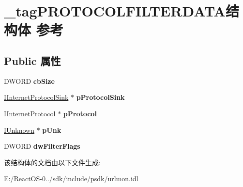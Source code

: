 \hypertarget{struct__tag_p_r_o_t_o_c_o_l_f_i_l_t_e_r_d_a_t_a}{}\section{\+\_\+tag\+P\+R\+O\+T\+O\+C\+O\+L\+F\+I\+L\+T\+E\+R\+D\+A\+T\+A结构体 参考}
\label{struct__tag_p_r_o_t_o_c_o_l_f_i_l_t_e_r_d_a_t_a}
\subsection*{Public 属性}
\begin{DoxyCompactItemize}
\item 
\mbox{\label{struct__tag_p_r_o_t_o_c_o_l_f_i_l_t_e_r_d_a_t_a_ad8ba3bdd16765b69b56fede4b9c3e1f0}} 
D\+W\+O\+RD {\bfseries cb\+Size}
\item 
\mbox{\label{struct__tag_p_r_o_t_o_c_o_l_f_i_l_t_e_r_d_a_t_a_a4d2bbe31e8289c6c3b338800f12342c7}} 
\hyperlink{interface_i_internet_protocol_sink}{I\+Internet\+Protocol\+Sink} $\ast$ {\bfseries p\+Protocol\+Sink}
\item 
\mbox{\label{struct__tag_p_r_o_t_o_c_o_l_f_i_l_t_e_r_d_a_t_a_a5da994f2a11b6e6bb5a1f48542fc1968}} 
\hyperlink{interface_i_internet_protocol}{I\+Internet\+Protocol} $\ast$ {\bfseries p\+Protocol}
\item 
\mbox{\label{struct__tag_p_r_o_t_o_c_o_l_f_i_l_t_e_r_d_a_t_a_a38eec49493f558dcc8a94d3df9bf77fc}} 
\hyperlink{interface_i_unknown}{I\+Unknown} $\ast$ {\bfseries p\+Unk}
\item 
\mbox{\label{struct__tag_p_r_o_t_o_c_o_l_f_i_l_t_e_r_d_a_t_a_a651b05be94a850712e131e05a4016992}} 
D\+W\+O\+RD {\bfseries dw\+Filter\+Flags}
\end{DoxyCompactItemize}


该结构体的文档由以下文件生成\+:\begin{DoxyCompactItemize}
\item 
E\+:/\+React\+O\+S-\/0../sdk/include/psdk/urlmon.\+idl\end{DoxyCompactItemize}
